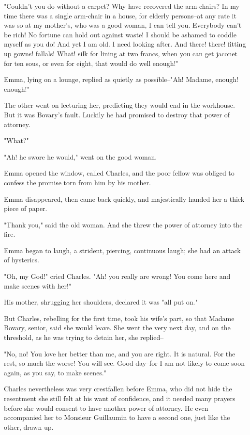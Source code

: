 \documentclass{tufte-book}
\begin{document}
"Couldn't you do without a carpet? Why have recovered the arm-chairs? In
my time there was a single arm-chair in a house, for elderly persons--at
any rate it was so at my mother's, who was a good woman, I can tell you.
Everybody can't be rich! No fortune can hold out against waste! I should
be ashamed to coddle myself as you do! And yet I am old. I need looking
after. And there! there! fitting up gowns! fallals! What! silk for
lining at two francs, when you can get jaconet for ten sous, or even for
eight, that would do well enough!"

Emma, lying on a lounge, replied as quietly as possible--"Ah! Madame,
enough! enough!"

The other went on lecturing her, predicting they would end in the
workhouse. But it was Bovary's fault. Luckily he had promised to destroy
that power of attorney.

"What?"

"Ah! he swore he would," went on the good woman.

Emma opened the window, called Charles, and the poor fellow was obliged
to confess the promise torn from him by his mother.

Emma disappeared, then came back quickly, and majestically handed her a
thick piece of paper.

"Thank you," said the old woman. And she threw the power of attorney
into the fire.

Emma began to laugh, a strident, piercing, continuous laugh; she had an
attack of hysterics.

"Oh, my God!" cried Charles. "Ah! you really are wrong! You come here
and make scenes with her!"

His mother, shrugging her shoulders, declared it was "all put on."

But Charles, rebelling for the first time, took his wife's part, so that
Madame Bovary, senior, said she would leave. She went the very next day,
and on the threshold, as he was trying to detain her, she replied--

"No, no! You love her better than me, and you are right. It is natural.
For the rest, so much the worse! You will see. Good day--for I am not
likely to come soon again, as you say, to make scenes."

Charles nevertheless was very crestfallen before Emma, who did not hide
the resentment she still felt at his want of confidence, and it needed
many prayers before she would consent to have another power of attorney.
He even accompanied her to Monsieur Guillaumin to have a second one,
just like the other, drawn up.
\end{document}
